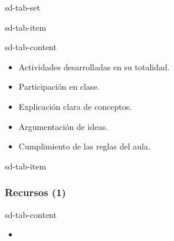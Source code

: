 \documentclass[letterpaper,10pt,spanish]{sphinxmanual}
\begin{document}
\begin{sphinxuseclass}{sd-tab-set}
\begin{sphinxuseclass}{sd-tab-item}
\begin{sphinxuseclass}{sd-tab-content}\begin{itemize}
\item {} 
\sphinxAtStartPar
Actividades desarrolladas en su totalidad.

\item {} 
\sphinxAtStartPar
Participación en clase.

\item {} 
\sphinxAtStartPar
Explicación clara de conceptos.

\item {} 
\sphinxAtStartPar
Argumentación de ideas.

\item {} 
\sphinxAtStartPar
Cumplimiento de las reglas del aula.

\end{itemize}

\end{sphinxuseclass}
\end{sphinxuseclass}
\begin{sphinxuseclass}{sd-tab-item}\subsubsection*{Recursos (1)}

\begin{sphinxuseclass}{sd-tab-content}\begin{itemize}
\item {} 
\sphinxAtStartPar
{\hyperref[\detokenize{cursos/ofimatica10/recursos/T02::doc}]{}}

\end{itemize}

\end{sphinxuseclass}
\end{sphinxuseclass}
\end{sphinxuseclass}
\end{document}
